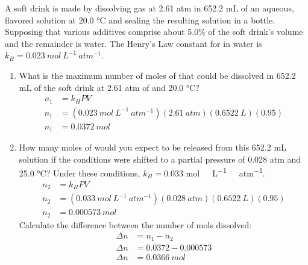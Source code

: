 \documentclass{article}
\begin{document}
A soft drink is made by dissolving  gas at 2.61 \si{atm} in 652.2
\si{mL} of an aqueous, flavored solution at 20.0 \si{\degreeCelsius} and sealing
the resulting solution in a bottle. Supposing that various additives comprise
about 5.0\% of the soft drink’s volume and the remainder is water. The Henry's
Law constant for  in water is $k_{H}=0.023\ \si{mol\ L^{-1}\
atm^{-1}}$.

\begin{enumerate}
    \item What is the maximum number of moles of  that could be
        dissolved in 652.2 \si{mL} of the soft drink at 2.61 \si{atm} of
        \ce{CO_{2}} and 20.0 \si{\degreeCelsius}?
    \begin{align*}
        n_{1}&=k_{H}PV\\
        n_{1}&=(0.023\ \si{mol\ L^{-1}\ atm^{-1}})(2.61\ \si{atm})(0.6522\
        \si{L})(0.95)\\
        n_{1}&=0.0372\ \si{mol}
    \end{align*}
    
    \item How many moles of  would you expect to be released from
        this 652.2 \si{mL} solution if the conditions were shifted to a
        \ce{CO_{2}} partial pressure of 0.028 \si{atm} and 25.0
        \si{\degreeCelsius}? Under these conditions, $k_{H}=0.033$ \si{mol\
        L^{-1}\ atm^{-1}}.
    \begin{align*}
        n_{2}&=k_{H}PV\\
        n_{2}&=(0.033\ \si{mol\ L^{-1}\ atm^{-1}})(0.028\ \si{atm})(0.6522\
        \si{L})(0.95)\\
        n_{2}&=0.000573\ \si{mol}
    \end{align*}
    Calculate the difference between the number of mols dissolved:
    \begin{align*}
        \Delta n &= n_{1}-n_{2}\\
        \Delta n &= 0.0372 - 0.000573\\
        \Delta n &= 0.0366\ \si{mol}
    \end{align*}
    
\end{enumerate}
\end{document}
